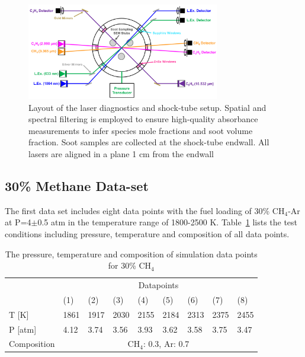 \begin{figure}[H]
	\centering
	\includegraphics[width=0.75\textwidth]{Figures/Results/Shocktube/laserdiagnostics.pdf}
	\caption{Layout of the laser diagnostics and shock-tube setup. Spatial and spectral filtering is employed to ensure high-quality absorbance measurements to infer species mole fractions and soot volume fraction. Soot samples are collected at the shock-tube endwall. All lasers are aligned in a plane 1 cm from the endwall}
	\label{fig:shocktubelaserlayout} 
\end{figure}

\subsection{30\% Methane Data-set}

The first data set includes eight data points with the fuel loading of 30\% $\mathrm{CH_4}$-Ar at P=4$\pm$0.5 atm in the temperature range of 1800-2500 K. Table~\ref{tab:shocktubest_CH4_30} lists the test conditions including pressure, temperature and composition of all data points.


\begin{table}[H]
	\caption{The pressure, temperature and composition of simulation data points for 30\% $\mathrm{CH_4}$}
	\centering
	\begin{tabular}{l|llllllll|}
		\cline{2-9}
     	& \multicolumn{8}{c|}{Datapoints}                       \\ \cline{2-9} 
		& (1)  & (2)  & (3)  & (4)  & (5)  & (6)  & (7)  & (8)  \\ \hline
		\multicolumn{1}{|l|}{T {[}K{]}}   & 1861 & 1917 & 2030 & 2155 & 2184 & 2313 & 2375 & 2455 \\ \hline
		\multicolumn{1}{|l|}{P {[}atm{]}} & 4.12 & 3.74 & 3.56 & 3.93 & 3.62 & 3.58 & 3.75 & 3.47 \\ \hline
		\multicolumn{1}{|l|}{Composition} & \multicolumn{8}{c|}{$\mathrm{CH_4}$: 0.3, Ar: 0.7}               \\ \hline
	\end{tabular}
	\label{tab:shocktubest_CH4_30} 
\end{table}

